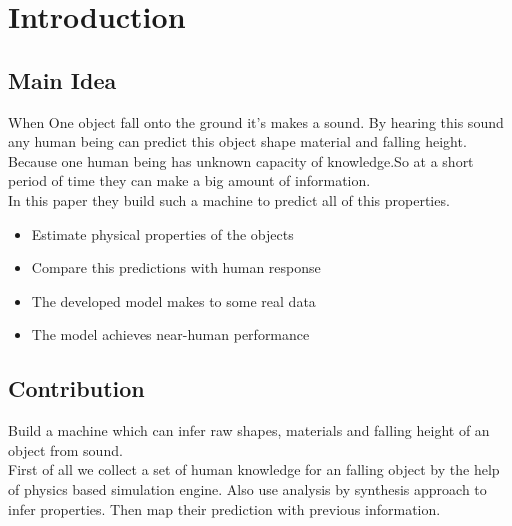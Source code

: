 \documentclass[12pt]{article}
\begin{document}
\tableofcontents       
\listoffigures
\thispagestyle{empty}

\section{Introduction}
\subsection{Main Idea}
When One object fall onto the ground it's makes a sound. By hearing this sound any 
human being can predict this object shape material and falling height. Because one human being has unknown capacity of knowledge.So at a short period of time they can make a big amount of information.\\
In this paper they build such a machine to predict all of this properties.
\begin{itemize} 
\item Estimate physical properties of the objects
\item Compare this predictions with human response
\item The developed model makes to some real data
\item The model achieves near-human performance

\end{itemize}


\subsection{Contribution}
Build a machine which can infer raw shapes, materials and falling height of an object from sound.\\
First of all we collect a set of human knowledge for an falling object by the help of physics based simulation engine. Also use analysis by synthesis approach to infer properties.
Then map their prediction with previous information.
\end{document}
